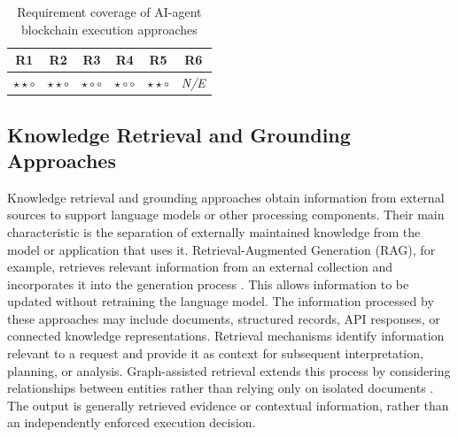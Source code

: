 \begin{table}[H]
\centering
\renewcommand{\arraystretch}{1.3}
\begin{tabular}{cccccc}
\hline
\textbf{R1} & \textbf{R2} & \textbf{R3} &
\textbf{R4} & \textbf{R5} & \textbf{R6} \\
\hline

$\star\star\circ$ &
$\star\star\circ$ &
$\star\circ\circ$ &
$\star\circ\circ$ &
$\star\star\circ$ &
\textit{N/E} \\

\hline
\end{tabular}
\caption{Requirement coverage of AI-agent blockchain
execution approaches}
\label{tab:req_ai_agent}
\end{table}



\subsection{Knowledge Retrieval and Grounding Approaches}
\label{subsec:knowledge_retrieval_grounding}

Knowledge retrieval and grounding approaches obtain information
from external sources to support language models or other
processing components. Their main characteristic is the
separation of externally maintained knowledge from the
model or application that uses it. Retrieval-Augmented
Generation (RAG), for example, retrieves relevant information
from an external collection and incorporates it into the
generation process \cite{lewisRetrievalAugmentedGeneration2020}.
This allows information to be updated without retraining the
language model. The information processed by these approaches may include
documents, structured records, API responses, or connected
knowledge representations. Retrieval mechanisms identify
information relevant to a request and provide it as context
for subsequent interpretation, planning, or analysis.
Graph-assisted retrieval extends this process by considering
relationships between entities rather than relying only
on isolated documents
\cite{hanRetrievalAugmentedGenerationGraphs2025}.
The output is generally retrieved evidence or contextual
information, rather than an independently enforced
execution decision.

